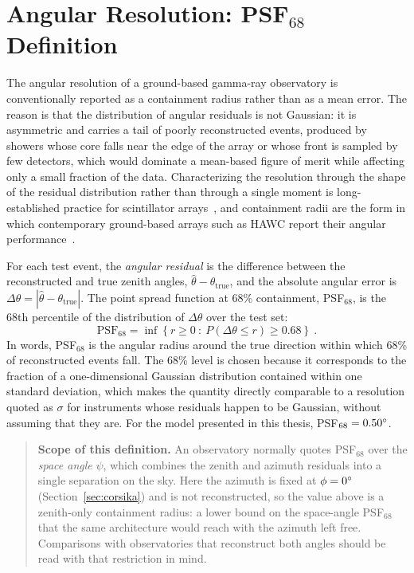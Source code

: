 \section{Angular Resolution: PSF\texorpdfstring{$_{68}$}{68} Definition} \label{sec:apx_psf}

The angular resolution of a ground-based gamma-ray observatory is conventionally reported as a containment radius rather than as a mean error. The reason is that the distribution of angular residuals is not Gaussian: it is asymmetric and carries a tail of poorly reconstructed events, produced by showers whose core falls near the edge of the array or whose front is sampled by few detectors, which would dominate a mean-based figure of merit while affecting only a small fraction of the data. Characterizing the resolution through the shape of the residual distribution rather than through a single moment is long-established practice for scintillator arrays~, and containment radii are the form in which contemporary ground-based arrays such as HAWC report their angular performance~.

For each test event, the \textit{angular residual} is the difference between the reconstructed and true zenith angles, $\hat{\theta} - \theta_\text{true}$, and the absolute angular error is $\Delta\theta = |\hat{\theta} - \theta_\text{true}|$. The point spread function at 68\% containment, PSF$_{68}$, is the 68th percentile of the distribution of $\Delta\theta$ over the test set:
\begin{equation}
    \text{PSF}_{68} = \inf \left\{ r \geq 0 \ : \ P\left( \Delta\theta \leq r \right) \geq 0.68 \right\} \ .
\end{equation}
In words, PSF$_{68}$ is the angular radius around the true direction within which 68\% of reconstructed events fall. The 68\% level is chosen because it corresponds to the fraction of a one-dimensional Gaussian distribution contained within one standard deviation, which makes the quantity directly comparable to a resolution quoted as $\sigma$ for instruments whose residuals happen to be Gaussian, without assuming that they are. For the model presented in this thesis, PSF$_{68} = 0.50\degree$.

\begin{quote}
\textbf{Scope of this definition.} An observatory normally quotes PSF$_{68}$ over the \textit{space angle} $\psi$, which combines the zenith and azimuth residuals into a single separation on the sky. Here the azimuth is fixed at $\phi = 0\degree$ (Section~\ref{sec:corsika}) and is not reconstructed, so the value above is a zenith-only containment radius: a lower bound on the space-angle PSF$_{68}$ that the same architecture would reach with the azimuth left free. Comparisons with observatories that reconstruct both angles should be read with that restriction in mind.
\end{quote}
